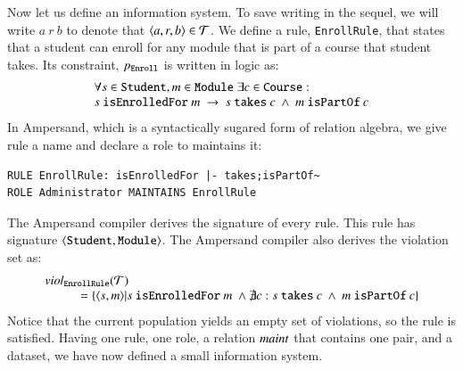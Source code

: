 \documentclass{elsarticle}
\begin{document}
	Now let us define an information system.
	To save writing in the sequel, we will write $a\ r\ b$ to denote that $\langle{a},{r},{b}\rangle\in\mathcal{T}$.
	We define a rule, {\tt EnrollRule}, that states that a student can enroll for any module that is part of a course that student takes.
	Its constraint, $p_{\tt Enroll}$ is written in logic as:
\[\begin{array}{l}\forall s\in\text{\tt Student}, m\in\text{\tt Module}\ \exists c\in\text{\tt Course}:\\
s\ \text{\tt isEnrolledFor}\ m\ \rightarrow\ s\ \text{\tt takes}\ c\ \wedge\ m\ \text{\tt isPartOf}\ c
\end{array}\]
	In Ampersand, which is a syntactically sugared form of relation algebra,
	we give rule a name and declare a role to maintains it:
\begin{verbatim}
RULE EnrollRule: isEnrolledFor |- takes;isPartOf~
ROLE Administrator MAINTAINS EnrollRule
\end{verbatim}
	The Ampersand compiler derives the signature of every rule.
	This rule has signature $\langle{\text{\tt Student}},{\text{\tt Module}}\rangle$.
	The Ampersand compiler also derives the violation set as:
\[\begin{array}{l}
	\viol{\text{\tt EnrollRule}}{\triples}\\
	\hspace{1cm}=\{\pair{s}{m}|s\ \text{\tt isEnrolledFor}\ m\ \wedge\not\exists c: s\ \text{\tt takes}\ c\ \wedge\ m\ \text{\tt isPartOf}\ c\}
\end{array}\]
	Notice that the current population yields an empty set of violations,
	so the rule is satisfied.
	Having one rule, one role, a relation $\text{\it maint\/}$ that contains one pair, and a dataset,
	we have now defined a small information system.
\end{document}
